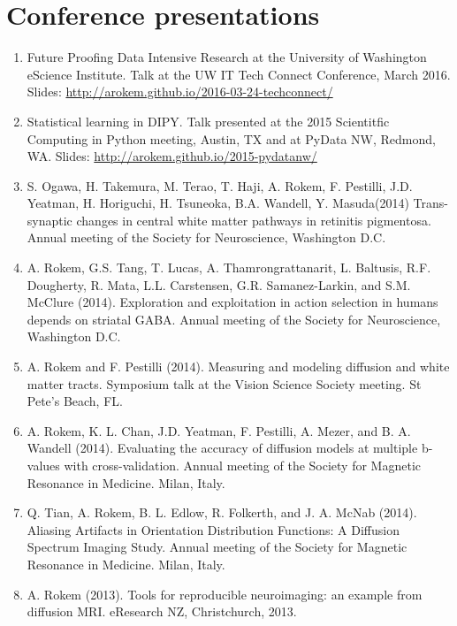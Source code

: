\documentclass[11pt,fullpage]{article}
\begin{document}
\section*{Conference presentations}
\begin{enumerate}

\item Future Proofing Data Intensive Research at the University of Washington eScience Institute. Talk at the UW IT Tech Connect Conference, March 2016. Slides: \url{http://arokem.github.io/2016-03-24-techconnect/}

\item Statistical learning in DIPY. Talk presented at the 2015 Scientitfic Computing in Python meeting, Austin, TX and at PyData NW, Redmond, WA. Slides: \url{http://arokem.github.io/2015-pydatanw/}

\item S. Ogawa, H. Takemura, M. Terao, T. Haji, A. Rokem, F. Pestilli, J.D. Yeatman, H. Horiguchi, H. Tsuneoka, B.A. Wandell, Y. Masuda(2014) Trans-synaptic changes in central white matter pathways in retinitis pigmentosa. Annual meeting of the Society for Neuroscience, Washington D.C.

\item A. Rokem, G.S. Tang, T. Lucas, A. Thamrongrattanarit, L. Baltusis, R.F. Dougherty, R. Mata, L.L. Carstensen, G.R. Samanez-Larkin, and S.M. McClure (2014). Exploration and exploitation in action selection in humans depends on striatal GABA. Annual meeting of the Society for Neuroscience, Washington D.C.

\item A. Rokem and F. Pestilli (2014). Measuring and modeling diffusion and white matter tracts. Symposium talk at the Vision Science Society meeting. St Pete's Beach, FL.

\item A. Rokem, K. L. Chan, J.D. Yeatman, F. Pestilli, A. Mezer, and B. A. Wandell (2014). Evaluating the accuracy of diffusion models at multiple b-values with cross-validation. Annual meeting of the Society for Magnetic Resonance in Medicine. Milan, Italy.

\item Q. Tian, A. Rokem, B. L. Edlow, R. Folkerth, and J. A. McNab (2014). Aliasing Artifacts in Orientation Distribution Functions: A Diffusion Spectrum Imaging Study. Annual meeting of the Society for Magnetic Resonance in Medicine. Milan, Italy.

\item A. Rokem (2013). Tools for reproducible neuroimaging: an example from diffusion MRI. eResearch NZ, Christchurch, 2013.


\end{enumerate}
\end{document}

